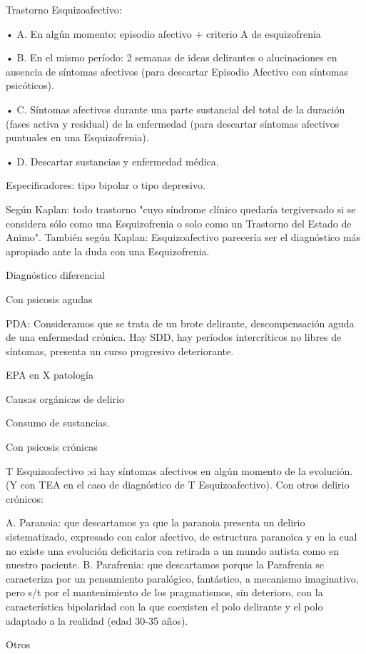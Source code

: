 Trastorno Esquizoafectivo:

• A. En algún momento: episodio afectivo + criterio A de esquizofrenia

• B. En el mismo período: 2 semanas de ideas delirantes o alucinaciones en ausencia de síntomas afectivos (para descartar Episodio Afectivo con síntomas psicóticos).

• C. Síntomas afectivos durante una parte sustancial del total de la duración (fases activa y residual) de la enfermedad (para descartar síntomas afectivos puntuales en una Esquizofrenia).

• D. Descartar sustancias y enfermedad médica.

Especificadores: tipo bipolar o tipo depresivo.

Según Kaplan: todo trastorno "cuyo síndrome clínico quedaría tergiversado si se considera sólo como una Esquizofrenia o solo como un Trastorno del Estado de Animo". También según Kaplan: Esquizoafectivo parecería ser el diagnóstico más apropiado ante la duda con una Esquizofrenia.

Diagnóstico diferencial

Con psicosis agudas

PDA: Consideramos que se trata de un brote delirante, descompensación aguda de una enfermedad crónica. Hay SDD, hay períodos intercríticos no libres de síntomas, presenta un curso progresivo deteriorante.

EPA en X patología

Causas orgánicas de delirio

Consumo de sustancias.

Con psicosis crónicas

T Esquizoafectivo :si hay síntomas afectivos en algún momento de la evolución. (Y con TEA en el caso de diagnóstico de T Esquizoafectivo). Con otros delirio crónicos:

A. Paranoia: que descartamos ya que la paranoia presenta un delirio sistematizado, expresado con calor afectivo, de estructura paranoica y en la cual no existe una evolución deficitaria con retirada a un mundo autista como en nuestro paciente.
B. Parafrenia: que descartamos porque la Parafrenia se caracteriza por un pensamiento paralógico, fantástico, a mecanismo imaginativo, pero s/t por el mantenimiento de los pragmatismos, sin deterioro, con la característica bipolaridad con la que coexisten el polo delirante y el polo adaptado a la realidad (edad 30-35 años).

Otros

